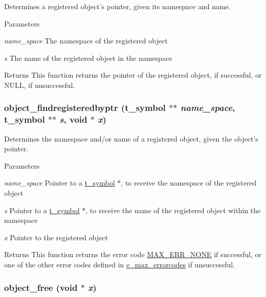 Determines a registered object's pointer, given its namespace and name. 
\begin{DoxyParams}{Parameters}
\item[{\em name\_\-space}]The namespace of the registered object \item[{\em s}]The name of the registered object in the namespace\end{DoxyParams}
\begin{DoxyReturn}{Returns}
This function returns the pointer of the registered object, if successful, or NULL, if unsuccessful. 
\end{DoxyReturn}
\hypertarget{group__obj_gadeb570bcae0e9bbf389d571e85d16bfa}{
\subsubsection[{object\_\-findregisteredbyptr}]{ object\_\-findregisteredbyptr ({\bf t\_\-symbol} $\ast$$\ast$ {\em name\_\-space}, \/  {\bf t\_\-symbol} $\ast$$\ast$ {\em s}, \/  void $\ast$ {\em x})}}
\label{group__obj_gadeb570bcae0e9bbf389d571e85d16bfa}


Determines the namespace and/or name of a registered object, given the object's pointer. 
\begin{DoxyParams}{Parameters}
\item[{\em name\_\-space}]Pointer to a \hyperlink{structt__symbol}{t\_\-symbol} $\ast$, to receive the namespace of the registered object \item[{\em s}]Pointer to a \hyperlink{structt__symbol}{t\_\-symbol} $\ast$, to receive the name of the registered object within the namespace \item[{\em x}]Pointer to the registered object\end{DoxyParams}
\begin{DoxyReturn}{Returns}
This function returns the error code \hyperlink{group__misc_gga0764dd6c02b76cca7d053ae50555d69da6d22f77fef8b1e1b074cef5d29d935fd}{MAX\_\-ERR\_\-NONE} if successful, or one of the other error codes defined in \hyperlink{group__misc_ga0764dd6c02b76cca7d053ae50555d69d}{e\_\-max\_\-errorcodes} if unsuccessful. 
\end{DoxyReturn}
\hypertarget{group__obj_ga3759846cb356195532c41e35b87522ee}{
\subsubsection[{object\_\-free}]{ object\_\-free (void $\ast$ {\em x})}}
\label{group__obj_ga3759846cb356195532c41e35b87522ee}


